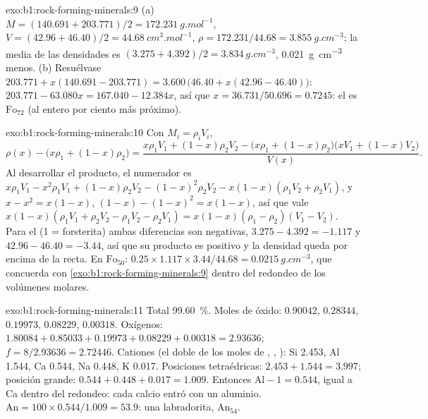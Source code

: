 \begin{solution}{exo:b1:rock-forming-minerals:9}
(a) $M = (140.691 + 203.771)/2 = \qty{172.231}{g.mol^{-1}}$, $V = (42.96 +
46.40)/2 = \qty{44.68}{cm^3.mol^{-1}}$, $\rho = 172.231/44.68 =
\qty{3.855}{g.cm^{-3}}$; la media de las densidades es $(3.275 + 4.392)/2 =
\qty{3.834}{g.cm^{-3}}$, \qty{0.021}{g.cm^{-3}} menos. (b) Resuélvase
$203.771 + x(140.691 - 203.771) = 3.600\,\bigl(46.40 + x(42.96 - 46.40)\bigr)$:
$203.771 - 63.080x = 167.040 - 12.384x$, así que $x = 36.731/50.696 = 0.7245$: el
 es $\text{Fo}_{72}$ (al entero por ciento más próximo).
\end{solution}

\begin{solution}{exo:b1:rock-forming-minerals:10}
Con $M_i = \rho_i V_i$,
\[
  \rho(x) - \bigl(x\rho_1 + (1 - x)\rho_2\bigr)
  = \frac{x\rho_1V_1 + (1 - x)\rho_2V_2 - \bigl(x\rho_1 + (1 - x)\rho_2\bigr)\bigl(xV_1 + (1 - x)V_2\bigr)}{V(x)} .
\]
Al desarrollar el producto, el numerador es $x\rho_1V_1 - x^2\rho_1V_1 +
(1 - x)\rho_2V_2 - (1 - x)^2\rho_2V_2 - x(1 - x)(\rho_1V_2 + \rho_2V_1)$, y
$x - x^2 = x(1 - x)$, $(1 - x) - (1 - x)^2 = x(1 - x)$, así que vale
$x(1 - x)(\rho_1V_1 + \rho_2V_2 - \rho_1V_2 - \rho_2V_1) =
x(1 - x)(\rho_1 - \rho_2)(V_1 - V_2)$. Para el  (1 = forsterita) ambas
diferencias son negativas, $3.275 - 4.392 = -1.117$ y $42.96 - 46.40 =
-3.44$, así que su producto es positivo y la densidad queda por encima de la recta. En $\text{Fo}_{50}$:
$0.25\times1.117\times3.44/44.68 =
\qty{0.0215}{g.cm^{-3}}$, que concuerda con \cref{exo:b1:rock-forming-minerals:9} dentro del redondeo de los
volúmenes molares.
\end{solution}

\begin{solution}{exo:b1:rock-forming-minerals:11}
Total \qty{99.60}{\percent}. Moles de óxido:  $0.90042$,
 $0.28344$,  $0.19973$,  $0.08229$,
 $0.00318$. Oxígenos: $1.80084 + 0.85033 + 0.19973 + 0.08229 +
0.00318 = 2.93636$; $f = 8/2.93636 = 2.72446$. Cationes (el doble de los moles de
, , ): Si \num{2.453}, Al \num{1.544}, Ca
\num{0.544}, Na \num{0.448}, K \num{0.017}. Posiciones tetraédricas:
$2.453 + 1.544 = 3.997$; posición grande: $0.544 + 0.448 + 0.017 = 1.009$. Entonces
$\mathrm{Al} - 1 = 0.544$, igual a Ca dentro del redondeo: cada calcio entró con un aluminio. $\mathrm{An} = 100\times0.544/1.009 = 53.9$:
una labradorita, $\text{An}_{54}$.
\end{solution}

